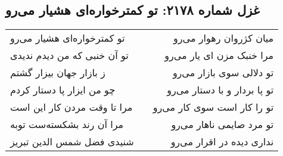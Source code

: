 \begin{center}
\section*{غزل شماره ۲۱۷۸: تو کمترخواره‌ای هشیار می‌رو}
\label{sec:2178}
\begin{longtable}{l p{0.5cm} r}
تو کمترخواره‌ای هشیار می‌رو
&&
میان کژروان رهوار می‌رو
\\
تو آن خنبی که من دیدم ندیدی
&&
مرا خنبک مزن ای یار می‌رو
\\
ز بازار جهان بیزار گشتم
&&
تو دلالی سوی بازار می‌رو
\\
چو من ایزار پا دستار کردم
&&
تو پا بردار و با دستار می‌رو
\\
مرا تا وقت مردن کار این است
&&
تو را کار است سوی کار می‌رو
\\
مرا آن رند بشکسته‌ست توبه
&&
تو مرد صایمی ناهار می‌رو
\\
شنیدی فضل شمس الدین تبریز
&&
نداری دیده در اقرار می‌رو
\\
\end{longtable}
\end{center}
